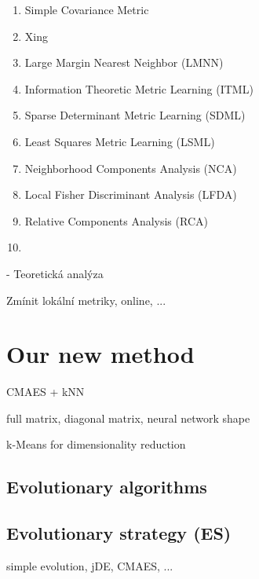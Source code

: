 \documentclass[12pt,a4paper]{report}
\begin{document}
\begin{enumerate}
\item Simple Covariance Metric
\item Xing \cite{xing2002distance}
\item Large Margin Nearest Neighbor (LMNN) \cite{weinberger2009distance}
\item Information Theoretic Metric Learning (ITML) \cite{davis2007information}
\item Sparse Determinant Metric Learning (SDML) \cite{qi2009efficient}
\item Least Squares Metric Learning (LSML) \cite{liu2012metric}
\item Neighborhood Components Analysis (NCA) \\ \cite{jacobgoldberger2004neighbourhood}
\item Local Fisher Discriminant Analysis (LFDA) \cite{sugiyama2007dimensionality}
\item Relative Components Analysis (RCA) \cite{shental2002adjustment}
\item \cite{fukui2013evolutionary}
\end{enumerate}

- Teoretická analýza

Zmínit lokální metriky, online, ...


\chapter{Our new method} \label{chap:our-method}

CMAES + kNN

full matrix, diagonal matrix, neural network shape

k-Means for dimensionality reduction

\section{Evolutionary algorithms}
\section{Evolutionary strategy (ES)}

simple evolution, jDE, CMAES, ...

\end{document}
